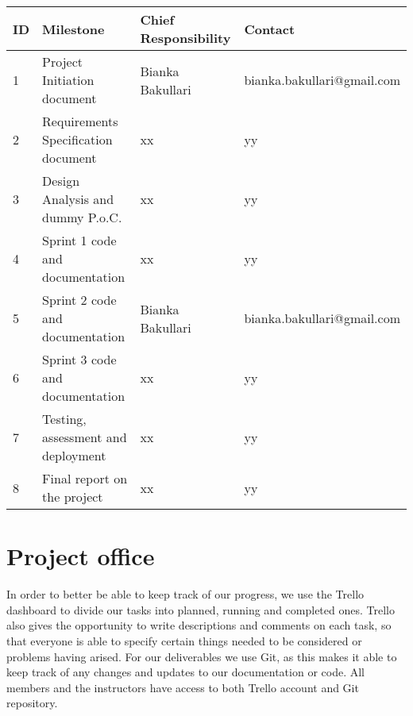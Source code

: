 \documentclass[notitlepage]{article}
\begin{document}
\begin{flushleft}
\begin{center}
  \begin{tabular}{ m{0.4cm} m{5cm} m{5cm} m{6cm} }
  	\hline
		ID & Milestone & Chief Responsibility & Contact \\ \hline
		1 & Project Initiation document & Bianka Bakullari & bianka.bakullari@gmail.com \\ \hline
		2 & Requirements Specification document & xx & yy \\ \hline
		3 & Design Analysis and dummy P.o.C. & xx & yy \\ \hline
		4 & Sprint 1 code and documentation & xx  & yy \\ \hline
		5 & Sprint 2 code and documentation & Bianka Bakullari & bianka.bakullari@gmail.com \\ \hline
		6 & Sprint 3 code and documentation & xx & yy \\ \hline
		7 & Testing, assessment and deployment & xx & yy \\ \hline
		8 & Final report on the project & xx & yy \\ \hline
	\end{tabular}
\end{center}













\section{Project office}

In order to better be able to keep track of our progress, we use the Trello dashboard to divide our tasks into planned, running and completed ones.
Trello also gives the opportunity to write descriptions and comments on each task, so that everyone is able to specify certain things needed to be considered or problems having arised.
For our deliverables we use Git, as this makes it able to keep track of any changes and updates to our documentation or code.
All members and the instructors have access to both Trello account and Git repository.

%
%  




\end{flushleft}
%
\end{document}
